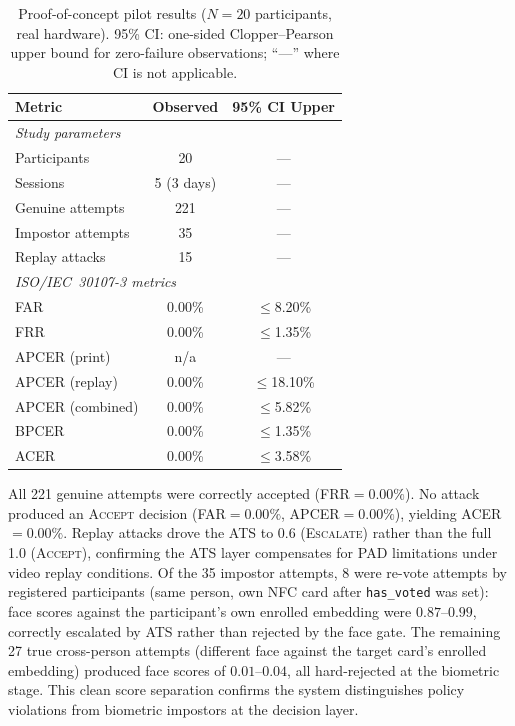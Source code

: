 \documentclass[conference]{IEEEtran}
\begin{document}
\begin{table}[t]
\centering
\caption{Proof-of-concept pilot results (\(N{=}20\) participants, real hardware).
  95\% CI: one-sided Clopper--Pearson upper bound for zero-failure
  observations; ``—'' where CI is not applicable.}
\label{tab:pilot}
\begin{tabular}{lcc}
  \toprule
  Metric & Observed & 95\% CI Upper \\
  \midrule
  \multicolumn{3}{l}{\textit{Study parameters}} \\
  \quad Participants       & 20  & — \\
  \quad Sessions           & 5 (3 days) & — \\
  \quad Genuine attempts   & 221 & — \\
  \quad Impostor attempts  & 35  & — \\
  \quad Replay attacks     & 15  & — \\
  \midrule
  \multicolumn{3}{l}{\textit{ISO/IEC~30107-3 metrics}} \\
  \quad FAR                & 0.00\% & \(\leq\)8.20\% \\
  \quad FRR                & 0.00\% & \(\leq\)1.35\% \\
  \quad APCER (print)      & n/a    & — \\
  \quad APCER (replay)     & 0.00\% & \(\leq\)18.10\% \\
  \quad APCER (combined)   & 0.00\% & \(\leq\)5.82\% \\
  \quad BPCER              & 0.00\% & \(\leq\)1.35\% \\
  \quad ACER               & 0.00\% & \(\leq\)3.58\% \\
  \bottomrule
\end{tabular}
\end{table}

All 221 genuine attempts were correctly accepted (FRR\(=0.00\%\)).
No attack produced an \textsc{Accept} decision (FAR\(=0.00\%\),
APCER\(=0.00\%\)), yielding ACER\(=0.00\%\). Replay attacks drove
the ATS to 0.6 (\textsc{Escalate}) rather than the full 1.0
(\textsc{Accept}), confirming the ATS layer compensates for
PAD limitations under video replay conditions. Of the 35 impostor attempts, 8 were re-vote attempts by registered
participants (same person, own NFC card after \texttt{has\_voted} was
set): face scores against the participant's own enrolled embedding were
\(0.87\)–\(0.99\), correctly escalated by ATS rather than rejected by
the face gate. The remaining 27 true cross-person attempts (different
face against the target card's enrolled embedding) produced face scores
of \(0.01\)–\(0.04\), all hard-rejected at the biometric stage.
This clean score separation confirms the system distinguishes policy
violations from biometric impostors at the decision layer.
\end{document}
